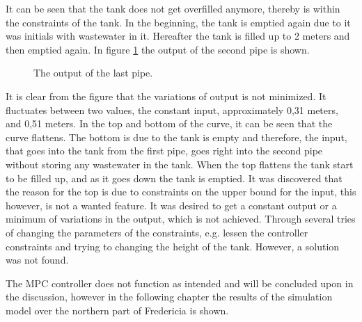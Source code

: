 It can be seen that the tank does not get overfilled anymore, thereby is within the constraints of the tank. In the beginning, the tank is emptied again due to it was initials with wastewater in it. Hereafter the tank is filled up to 2 meters and then emptied again. In figure \ref{fig:MPC_test_output_second_test_with_constraints} the output of the second pipe is shown. 

\begin{figure}[H]
 \centering
 
\caption{The output of the last pipe.}
\label{fig:MPC_test_output_second_test_with_constraints}
\end{figure}

It is clear from the figure that the variations of output is not minimized. It fluctuates between two values, the constant input, approximately 0,31 meters, and 0,51 meters. In the top and bottom of the curve, it can be seen that the curve flattens. The bottom is due to the tank is empty and therefore, the input, that goes into the tank from the first pipe, goes right into the second pipe without storing any wastewater in the tank. When the top flattens the tank start to be filled up, and as it goes down the tank is emptied. It was discovered that the reason for the top is due to constraints on the upper bound for the input, this however, is not a wanted feature. It was desired to get a constant output or a minimum of variations in the output, which is not achieved. Through several tries of changing the parameters of the constraints, e.g. lessen the controller constraints and trying to changing the height of the tank. However, a solution was not found.

The MPC controller does not function as intended and will be concluded upon in the discussion, however in the following chapter the results of the simulation model over the northern part of Fredericia is shown.







